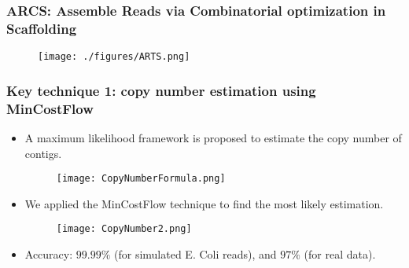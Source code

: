 \documentclass[mathserif]{beamer}
\begin{document}
	
		
		\begin{frame}
		\frametitle{ARCS: Assemble Reads via Combinatorial optimization in  Scaffolding}
			\begin{figure}
				\centering
				\texttt{[image: ./figures/ARTS.png]}
			\end{figure}
		\end{frame}				
		
	\begin{frame}
	\frametitle{Key technique 1: copy number estimation using {\sc MinCostFlow}} 
	
	\begin{itemize}
	\item 
	A maximum likelihood framework is proposed to estimate the copy number of contigs.\\
			\begin{figure}
				\centering
				\texttt{[image: CopyNumberFormula.png]}
			\end{figure}

	\item We applied the {\sc MinCostFlow} technique to find the most likely estimation. 
			\begin{figure}
				\centering
				\texttt{[image: CopyNumber2.png]}
			\end{figure}
	\item Accuracy:  $99.99\%$ (for simulated E. Coli reads), and $97\%$ (for real data). 
	\end{itemize} 
	
	\end{frame}
	
\end{document}
